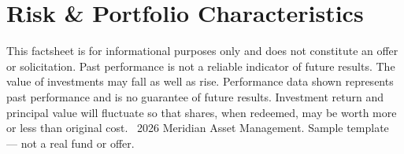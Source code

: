 \section{Risk \& Portfolio Characteristics}
\vspace{-2pt}
\hfill
{}\hfill
{}\hfill
{}\hfill
{}\hfill
{}
\vspace{6pt}

{\color{ltslate}\fontsize{6.5}{8}\selectfont
This factsheet is for informational purposes only and does not constitute an offer or solicitation.
Past performance is not a reliable indicator of future results. The value of investments may fall as well as rise.
Performance data shown represents past performance and is no guarantee of future results. Investment return and
principal value will fluctuate so that shares, when redeemed, may be worth more or less than original cost.
\textcopyright\ 2026 Meridian Asset Management. Sample template --- not a real fund or offer.
}
